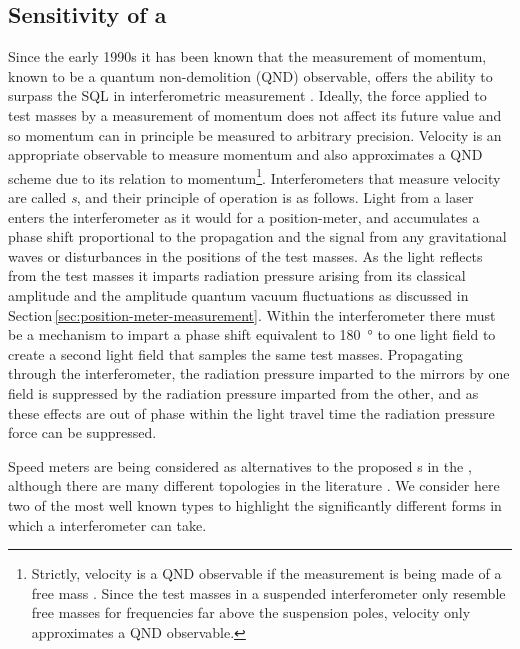 \subsection{\label{sec:speed-meter-measurement}Sensitivity of a \SM{}}
Since the early 1990s it has been known that the measurement of momentum, known to be a quantum non-demolition (\gls{QND}) observable, offers the ability to surpass the \gls{SQL} in interferometric measurement \cite{Braginsky1990}. Ideally, the force applied to test masses by a measurement of momentum does not affect its future value and so momentum can in principle be measured to arbitrary precision. Velocity is an appropriate observable to measure momentum and also approximates a \gls{QND} scheme due to its relation to momentum\footnote{Strictly, velocity is a \gls{QND} observable if the measurement is being made of a free mass \cite{Danilishin2012}. Since the test masses in a suspended interferometer only resemble free masses for frequencies far above the suspension poles, velocity only approximates a \gls{QND} observable.}. Interferometers that measure velocity are called \emph{\SM{}s}, and their principle of operation is as follows. Light from a laser enters the interferometer as it would for a position-meter, and accumulates a phase shift proportional to the propagation and the signal from any gravitational waves or disturbances in the positions of the test masses. As the light reflects from the test masses it imparts radiation pressure arising from its classical amplitude and the amplitude quantum vacuum fluctuations as discussed in Section\,\ref{sec:position-meter-measurement}. Within the interferometer there must be a mechanism to impart a phase shift equivalent to \SI{180}{\degree} to one light field to create a second light field that samples the same test masses. Propagating through the interferometer, the radiation pressure imparted to the mirrors by one field is suppressed by the radiation pressure imparted from the other, and as these effects are out of phase within the light travel time the radiation pressure force can be suppressed.

Speed meters are being considered as alternatives to the proposed \MI{}s in the \ET{} \cite{MuellerEbhardt2009a, Voronchev2015}, although there are many different \SM{} topologies in the literature \cite{Danilishin2004, Wang2013, Huttner2016, Wade2012}. We consider here two of the most well known types to highlight the significantly different forms in which a \SM{} interferometer can take.

